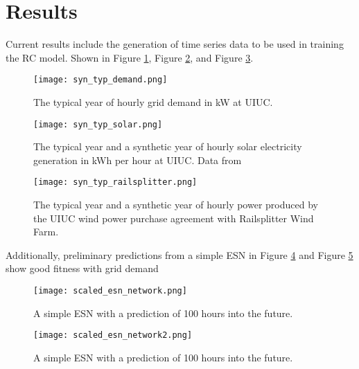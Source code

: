 \section{Results}

Current results include the generation of time series data to be used in
training the RC model. Shown in Figure \ref{fig:demand}, Figure \ref{fig:solar}, and Figure \ref{fig:wind}.

\begin{figure}[h]
 	\centering
 	\label{fig:demand}
 	\texttt{[image: syn\_typ\_demand.png]}
 	\caption{The typical year of hourly grid demand in kW at UIUC.}
\end{figure}
\begin{figure}[h]
	\centering
	\label{fig:solar}
	\texttt{[image: syn\_typ\_solar.png]}
	\caption{The typical year and a synthetic year of hourly solar electricity
  generation in kWh per hour at UIUC. Data from
  \cite{alsoenergy_university_2019}}
\end{figure}
\begin{figure}[h]
	\centering
	\label{fig:wind}
	\texttt{[image: syn\_typ\_railsplitter.png]}
	\caption{The typical year and a synthetic year of hourly power produced by
  the UIUC wind power purchase agreement with Railsplitter Wind Farm.}
\end{figure}

Additionally, preliminary predictions from a simple \acrshort{ESN}
in Figure \ref{fig:ESN1} and Figure \ref{fig:ESN2} show good fitness with grid
demand

\begin{figure}[h]
  \texttt{[image: scaled\_esn\_network.png]}
  \caption{A simple ESN with a prediction of 100 hours into the future.}
  \label{fig:ESN1}
\end{figure}
\begin{figure}[h]
  \texttt{[image: scaled\_esn\_network2.png]}
  \caption{A simple ESN with a prediction of 100 hours into the future.}
  \label{fig:ESN2}
\end{figure}
